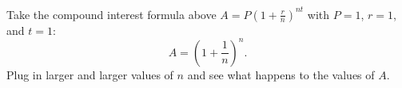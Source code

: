 \documentclass{ximera}
\begin{document}
\begin{question}
	Take the compound interest formula above $\displaystyle A = P\left( 1 + \frac{r}{n}\right)^{nt}$ with $P = 1$, $r = 1$, and $t = 1$:
	\[ A = \left( 1 + \frac{1}{n} \right)^{n}. \]
	Plug in larger and larger values of $n$ and see what happens to the values of $A$.
	\begin{multipleChoice}
	\end{multipleChoice}
\end{question}
%
\end{document}
